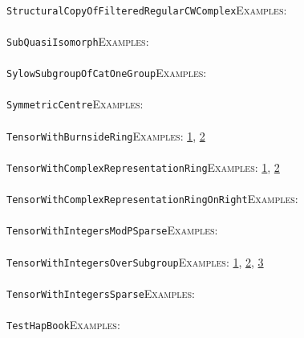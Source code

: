 \documentclass[a4paper,11pt]{report}
\begin{document}
{{ \\
 \texttt{StructuralCopyOfFilteredRegularCWComplex}{\nobreakspace}{\nobreakspace}{\nobreakspace}{\nobreakspace}\textsc{Examples:} \\
 \\
 \texttt{SubQuasiIsomorph}{\nobreakspace}{\nobreakspace}{\nobreakspace}{\nobreakspace}\textsc{Examples:} \\
 \\
 \texttt{SylowSubgroupOfCatOneGroup}{\nobreakspace}{\nobreakspace}{\nobreakspace}{\nobreakspace}\textsc{Examples:} \\
 \\
 \texttt{SymmetricCentre}{\nobreakspace}{\nobreakspace}{\nobreakspace}{\nobreakspace}\textsc{Examples:} \\
 \\
 \texttt{TensorWithBurnsideRing}{\nobreakspace}{\nobreakspace}{\nobreakspace}{\nobreakspace}\textsc{Examples:} \href{tutorial/chap8.html} {1}{\nobreakspace}, \href{../www/SideLinks/About/aboutBredon.html} {2}{\nobreakspace} \\
 \\
 \texttt{TensorWithComplexRepresentationRing}{\nobreakspace}{\nobreakspace}{\nobreakspace}{\nobreakspace}\textsc{Examples:} \href{tutorial/chap8.html} {1}{\nobreakspace}, \href{../www/SideLinks/About/aboutBredon.html} {2}{\nobreakspace} \\
 \\
 \texttt{TensorWithComplexRepresentationRingOnRight}{\nobreakspace}{\nobreakspace}{\nobreakspace}{\nobreakspace}\textsc{Examples:} \\
 \\
 \texttt{TensorWithIntegersModPSparse}{\nobreakspace}{\nobreakspace}{\nobreakspace}{\nobreakspace}\textsc{Examples:} \\
 \\
 \texttt{TensorWithIntegersOverSubgroup}{\nobreakspace}{\nobreakspace}{\nobreakspace}{\nobreakspace}\textsc{Examples:} \href{tutorial/chap3.html} {1}{\nobreakspace}, \href{../www/SideLinks/About/aboutCoveringSpaces.html} {2}{\nobreakspace}, \href{../www/SideLinks/About/aboutCoverinSpaces.html} {3}{\nobreakspace} \\
 \\
 \texttt{TensorWithIntegersSparse}{\nobreakspace}{\nobreakspace}{\nobreakspace}{\nobreakspace}\textsc{Examples:} \\
 \\
 \texttt{TestHapBook}{\nobreakspace}{\nobreakspace}{\nobreakspace}{\nobreakspace}\textsc{Examples:} \\
}}
\end{document}
